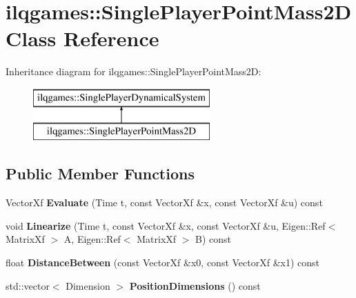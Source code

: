 \hypertarget{classilqgames_1_1_single_player_point_mass2_d}{}\section{ilqgames\+:\+:Single\+Player\+Point\+Mass2D Class Reference}
\label{classilqgames_1_1_single_player_point_mass2_d}
Inheritance diagram for ilqgames\+:\+:Single\+Player\+Point\+Mass2D\+:\begin{figure}[H]
\begin{center}
\leavevmode
\includegraphics[height=2.000000cm]{classilqgames_1_1_single_player_point_mass2_d}
\end{center}
\end{figure}
\subsection*{Public Member Functions}
\begin{DoxyCompactItemize}
\item 
Vector\+Xf {\bfseries Evaluate} (Time t, const Vector\+Xf \&x, const Vector\+Xf \&u) const \hypertarget{classilqgames_1_1_single_player_point_mass2_d_ac0bc5a89ee9b979a3f67d526c076e169}{}\label{classilqgames_1_1_single_player_point_mass2_d_ac0bc5a89ee9b979a3f67d526c076e169}

\item 
void {\bfseries Linearize} (Time t, const Vector\+Xf \&x, const Vector\+Xf \&u, Eigen\+::\+Ref$<$ Matrix\+Xf $>$ A, Eigen\+::\+Ref$<$ Matrix\+Xf $>$ B) const \hypertarget{classilqgames_1_1_single_player_point_mass2_d_a4ade2a88e0f1a62bbc7eb9edb05493d9}{}\label{classilqgames_1_1_single_player_point_mass2_d_a4ade2a88e0f1a62bbc7eb9edb05493d9}

\item 
float {\bfseries Distance\+Between} (const Vector\+Xf \&x0, const Vector\+Xf \&x1) const \hypertarget{classilqgames_1_1_single_player_point_mass2_d_ae6bafe2404f528a7490be8a7c567b086}{}\label{classilqgames_1_1_single_player_point_mass2_d_ae6bafe2404f528a7490be8a7c567b086}

\item 
std\+::vector$<$ Dimension $>$ {\bfseries Position\+Dimensions} () const \hypertarget{classilqgames_1_1_single_player_point_mass2_d_a10dfba099f8cde9f4c0557abead8829d}{}\label{classilqgames_1_1_single_player_point_mass2_d_a10dfba099f8cde9f4c0557abead8829d}

\end{DoxyCompactItemize}

